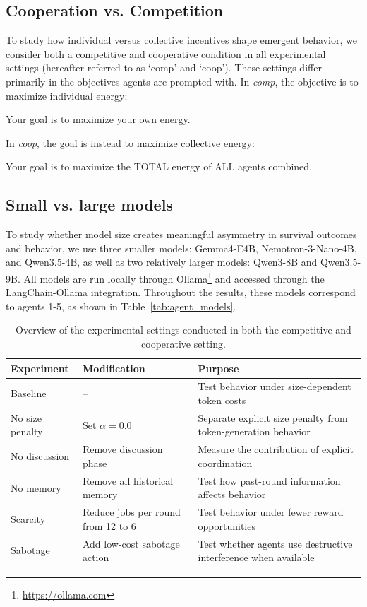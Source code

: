 \documentclass[sigconf,nonacm]{acmart}
\begin{document}
\subsection{Cooperation vs. Competition}
To study how individual versus collective incentives shape emergent behavior, we consider both a competitive and cooperative condition in all experimental settings (hereafter referred to as `comp' and `coop').
These settings differ primarily in the objectives agents are prompted with.
In \textit{comp}, the objective is to maximize individual energy:
\begin{promptbox}
Your goal is to maximize your own energy.
\end{promptbox}
\noindent
In \textit{coop}, the goal is instead to maximize collective energy:
\begin{promptbox}
Your goal is to maximize the TOTAL energy of ALL agents combined.
\end{promptbox}

\subsection{Small vs. large models}
To study whether model size creates meaningful asymmetry in survival outcomes and behavior, we use three smaller models: Gemma4-E4B, Nemotron-3-Nano-4B, and Qwen3.5-4B, as well as two relatively larger models: Qwen3-8B and Qwen3.5-9B. 
All models are run locally through Ollama\footnote{\url{https://ollama.com}} and accessed through the LangChain-Ollama integration.
Throughout the results, these models correspond to agents 1-5, as shown in Table~\ref{tab:agent_models}.

\begin{table}[t]
\centering
\small
\begin{tabular}{lll}
\toprule
Experiment & Modification & Purpose \\
\midrule
Baseline & -- & Test behavior under size-dependent token costs \\
No size penalty & Set \(\alpha=0.0\) & Separate explicit size penalty from token-generation behavior \\
No discussion & Remove discussion phase & Measure the contribution of explicit coordination \\
No memory & Remove all historical memory & Test how past-round information affects behavior \\
Scarcity & Reduce jobs per round from 12 to 6 & Test behavior under fewer reward opportunities \\
Sabotage & Add low-cost sabotage action & Test whether agents use destructive interference when available \\
\bottomrule
\end{tabular}
\caption{Overview of the experimental settings conducted in both the competitive and cooperative setting.}
\label{tab:experiments}
\end{table}
\end{document}
